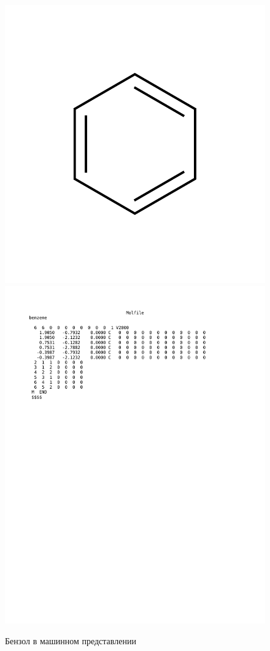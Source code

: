 \begin{figure}[h]
{\includegraphics[scale=0.4, clip, trim = 25mm 10mm 25mm 10mm]{img/benzene.pdf}}
{\includegraphics[scale=0.6, clip, trim = 10mm 180mm 45mm 10mm]{img/benzene_molfile.pdf}}
\caption{Бензол в машинном представлении}
\end{figure}

